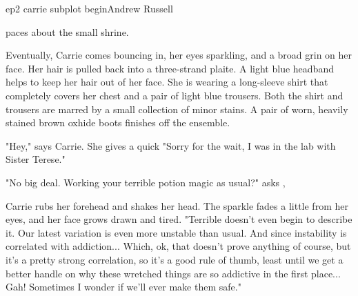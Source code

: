 \documentclass{book}
\begin{document}
\begin{childnode}{ep2 carrie subplot begin}{Andrew Russell}



    \name{} paces about the small shrine. 

    Eventually, Carrie comes bouncing in, her eyes sparkling, and a broad grin on her face. Her hair is pulled back into a three-strand plaite. A light blue headband helps to keep her hair out of
    her face. She is wearing a long-sleeve shirt that completely 
    covers her chest and a pair of light blue trousers. Both the shirt and trousers are marred by a small collection of minor stains. A pair of worn, heavily stained brown oxhide 
    boots finishes off the ensemble.

    "Hey," says Carrie. She gives \name{} a quick  "Sorry for the wait, I was in the lab with Sister Terese."

    "No big deal. Working your terrible potion magic as usual?" asks \name{}, 

    Carrie rubs her forehead and shakes her head. The sparkle fades a little from her eyes, and her face grows drawn and tired. "Terrible doesn't even begin to describe it. Our latest variation is 
    even more unstable than usual. And since instability is correlated with addiction... 
    Which, ok, that doesn't prove anything of course, but it's a pretty strong correlation, so it's a good rule of thumb, least until we get a better handle on why these wretched things are so
    addictive in the first place... Gah! Sometimes I wonder if we'll ever make them safe."


\end{childnode}
\end{document}
